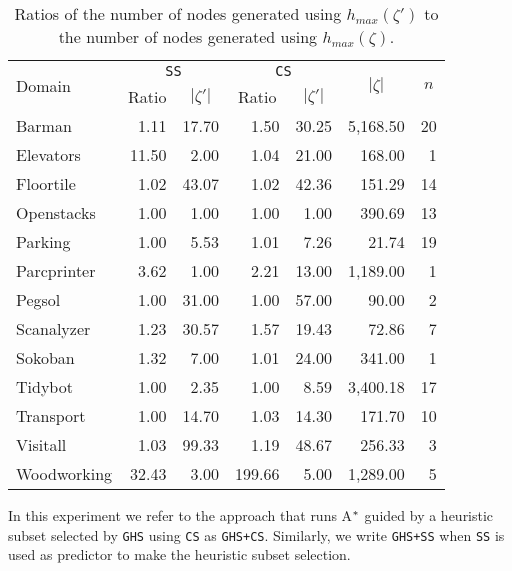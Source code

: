 \begin{table}[t]
\centering
\caption{Ratios of the number of nodes generated using $h_{max}(\zeta')$ to the number of nodes generated using $h_{max}(\zeta)$.} 
\begin{tabular}{l r r r r r r }
\hline
 \multirow{2}{*}{Domain} & \multicolumn{2}{c}{\texttt{SS}}  & \multicolumn{2}{c}{\texttt{CS}} &  \multicolumn{1}{c}{\multirow{2}{*}{$|\zeta|$}}  &  \multicolumn{1}{c}{\multirow{2}{*}{$n$}} \\[\arrayrulewidth]
  \cline{2-5} 
 & \multicolumn{1}{c}{Ratio} & \multicolumn{1}{c}{$|\zeta'|$} & \multicolumn{1}{c}{Ratio} & \multicolumn{1}{c}{$|\zeta'|$} & & \\[\arrayrulewidth] 
\hline
Barman & 1.11 & 17.70 & 1.50 & 30.25 & 5,168.50 & 20 \\ 
Elevators & 11.50 & 2.00 & 1.04 & 21.00 & 168.00 & 1 \\
Floortile & 1.02 & 43.07 & 1.02 & 42.36 & 151.29 & 14 \\ 
Openstacks & 1.00 & 1.00 & 1.00 & 1.00 & 390.69 & 13 \\ 
Parking & 1.00 & 5.53 & 1.01 & 7.26 & 21.74 & 19 \\ 
Parcprinter & 3.62 & 1.00 & 2.21 & 13.00 & 1,189.00 & 1 \\ 
Pegsol & 1.00 & 31.00 & 1.00 & 57.00 & 90.00 & 2 \\ 
Scanalyzer & 1.23 & 30.57 & 1.57 & 19.43 & 72.86 & 7 \\ 
Sokoban & 1.32 & 7.00 & 1.01 & 24.00 & 341.00 & 1 \\
Tidybot & 1.00 & 2.35 & 1.00 & 8.59 & 3,400.18 & 17 \\ 
Transport & 1.00 & 14.70 & 1.03 & 14.30 & 171.70 & 10 \\ 
Visitall & 1.03 & 99.33 & 1.19 & 48.67 & 256.33 & 3 \\ 
Woodworking & 32.43 & 3.00 & 199.66 & 5.00 & 1,289.00 & 5 \\ 
\hline
\end{tabular}
\label{tb_one}
\end{table}

In this experiment we refer to the approach that runs A$\sp{*}$ guided by a heuristic subset selected by \texttt{GHS} using \texttt{CS} as \texttt{GHS+CS}. Similarly, we write \texttt{GHS+SS} when \texttt{SS} is used as predictor to make the heuristic subset selection.


